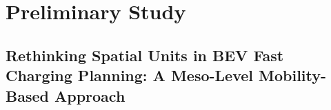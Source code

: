 \chapter{Preliminary Study}
\label{ch:prior_work}

\section{Rethinking Spatial Units in BEV Fast Charging Planning: A Meso-Level Mobility-Based Approach}
\label{sec:prior_work}


